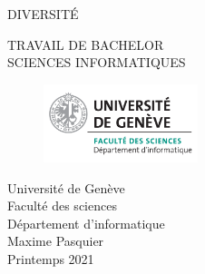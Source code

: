 \thispagestyle{empty}

\vspace*{+5em}
\begin{center}
DIVERSITÉ\\
\vspace*{+8em}

\vspace{+2em}
TRAVAIL DE BACHELOR\\
SCIENCES INFORMATIQUES\\

\vspace*{+3em}
\begin{figure}[H]
\centering
\includegraphics[width=0.4\textwidth]{Images/unige_csd.png}
\end{figure}

\vspace*{+3em}
Université de Genève\\
Faculté des sciences\\
Département d'informatique\\
\vspace*{+2em}
Maxime Pasquier\\

\vspace*{+12em}
Printemps 2021

\end{center}